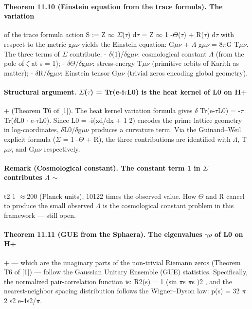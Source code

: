 \paragraph*{Theorem 11.10 (Einstein equation from the trace formula). The variation}
of the trace formula action S := Z $\infty$ $\Sigma$($\tau$) d$\tau$ = Z $\infty$ 1 -$\Theta$($\tau$) + R($\tau$)
d$\tau$
with respect to the metric g$\mu$$\nu$ yields the Einstein equation: G$\mu$$\nu$ + $\Lambda$ g$\mu$$\nu$ = 8$\pi$G T$\mu$$\nu$. The three terms of $\Sigma$ contribute:
- $\delta$(1)/$\delta$g$\mu$$\nu$: cosmological constant $\Lambda$ (from the pole of $\zeta$ at s = 1);
- $\delta$$\Theta$/$\delta$g$\mu$$\nu$: stress-energy T$\mu$$\nu$ (primitive orbits of Karith as matter);
- $\delta$R/$\delta$g$\mu$$\nu$: Einstein tensor G$\mu$$\nu$ (trivial zeros encoding global geometry).
\paragraph*{Structural argument. $\Sigma$($\tau$) = Tr(e-i$\tau$L0) is the heat kernel of L0 on H+}
+ (Theorem T6 of [1]). The heat kernel variation formula gives $\delta$ Tr(e-$\tau$L0) = -$\tau$ Tr($\delta$L0 $\cdot$ e-$\tau$L0). Since L0 = -i(xd/dx + 1 2) encodes the prime lattice geometry in log-coordinates, $\delta$L0/$\delta$g$\mu$$\nu$ produces a curvature term. Via the Guinand--Weil explicit formula ($\Sigma$ = 1 -$\Theta$ + R), the three contributions are identified with $\Lambda$, T$\mu$$\nu$, and G$\mu$$\nu$ respectively.
\paragraph*{Remark (Cosmological constant). The constant term 1 in $\Sigma$ contributes $\Lambda$ $\sim$}
t2 1 $\approx$200 (Planck units), 10122 times the observed value. How $\Theta$ and R cancel to produce the small observed $\Lambda$ is the cosmological constant problem in this framework --- still open.
\paragraph*{Theorem 11.11 (GUE from the Sphaera). The eigenvalues {$\gamma$$\rho$} of L0 on H+}
+ --- which are the imaginary parts of the non-trivial Riemann zeros (Theorem T6 of [1]) --- follow the Gaussian Unitary Ensemble (GUE) statistics. Specifically, the normalized pair-correlation function is: R2(s) = 1 (sin $\pi$s $\pi$s )2 , and the nearest-neighbor spacing distribution follows the Wigner--Dyson law: p(s) = 32 $\pi$2 s2 e-4s2/$\pi$.
